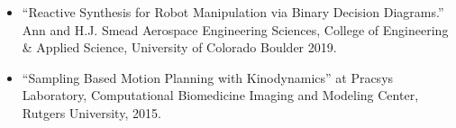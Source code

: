 \documentclass[11pt,a4paper,sans]{moderncv}        %
\begin{document}
\vspace{6pt}
 
\begin{itemize}

\item{“Reactive Synthesis for Robot Manipulation via Binary Decision Diagrams.” Ann and H.J. Smead Aerospace Engineering Sciences, College of Engineering \& Applied Science, University of Colorado Boulder 2019.}

\vspace{6pt}

\item{“Sampling Based Motion Planning with Kinodynamics” at Pracsys Laboratory, Computational Biomedicine Imaging and Modeling Center, Rutgers University, 2015.}

\end{itemize}

% 


\end{document}
